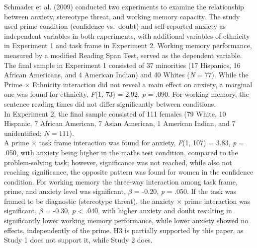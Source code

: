 \documentclass[
  stu, a4paper, 12pt,mask,floatsintext]{apa7}
\begin{document}
Schmader et al. (2009) conducted two experiments to examine the relationship between anxiety, stereotype threat, and working memory capacity.
The study used prime condition (confidence vs.~doubt) and self-reported anxiety as independent variables in both experiments, with additional variables of ethnicity in Experiment 1 and task frame in Experiment 2.
Working memory performance, measured by a modified Reading Span Test, served as the dependent variable.
The final sample in Experiment 1 consisted of 37 minorities (17 Hispanics, 16 African Americans, and 4 American Indian) and 40 Whites (\(N = 77\)).
While the Prime \(\times\) Ethnicity interaction did not reveal a main effect on anxiety, a marginal one was found for ethnicity, \emph{F}(1, 73) = 2.92, \emph{p} = .090.
For working memory, the sentence reading times did not differ significantly between conditions.\\
In Experiment 2, the final sample consisted of 111 females (79 White, 10 Hispanic, 7 African American, 7 Asian American, 1 American Indian, and 7 unidentified; \(N = 111\)).\\
A prime \(\times\) task frame interaction was found for anxiety, \emph{F}(1, 107) = 3.83, \emph{p} = .050, with anxiety being higher in the maths test condition, compared to the problem-solving task; however, significance was not reached, while also not reaching significance, the opposite pattern was found for women in the confidence condition.
For working memory the three-way interaction among task frame, prime, and anxiety level was significant, \(\beta\) = -0.20, \emph{p} = .050.
If the task was framed to be diagnostic (stereotype threat), the anxiety \(\times\) prime interaction was significant, \(\beta\) = -0.30, \emph{p} \textless{} .040, with higher anxiety and doubt resulting in significantly lower working memory performance, while lower anxiety showed no effects, independently of the prime.
H3 is partially supported by this paper, as Study 1 does not support it, while Study 2 does.
\end{document}
